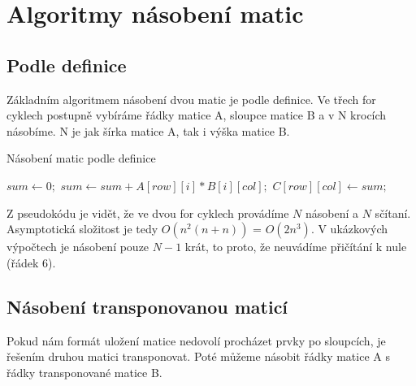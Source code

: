 \documentclass[thesis=B,czech]{FITthesis}[2012/06/26]
\begin{document}


\chapter{Algoritmy násobení matic}

\section{Podle definice}

Základním algoritmem násobení dvou matic je podle definice. Ve třech for cyklech postupně  vybíráme řádky matice A, sloupce matice B a v N krocích násobíme. N je jak šírka matice A, tak i výška matice B.

\begin{algorithm}
	\caption{Násobení matic podle definice}\label{mmm-by-definiton}
	\begin{algorithmic}[1]
		\State \texttt{$sum \gets 0;$}
			\State \texttt{$sum \gets sum + A[row][i] * B[i][col];$}
		\EndFor
		\State \texttt{$C[row][col] \gets sum;$}
	\EndFor
\EndFor
		\EndProcedure
	\end{algorithmic}
\end{algorithm}

Z pseudokódu je vidět, že ve dvou for cyklech provádíme $N$ násobení a $N$ sčítaní. Asymptotická složitost je tedy $O(n^2(n + n))$ = $O(2n^3)$. V ukázkových výpočtech je násobení pouze $N-1$ krát, to proto, že neuvádíme přičítání k nule (řádek 6).


\section{Násobení transponovanou maticí}

Pokud nám formát uložení matice nedovolí procházet prvky po sloupcích, je řešením druhou matici transponovat. Poté můžeme násobit řádky matice A s řádky transponované matice B.
\end{document}

